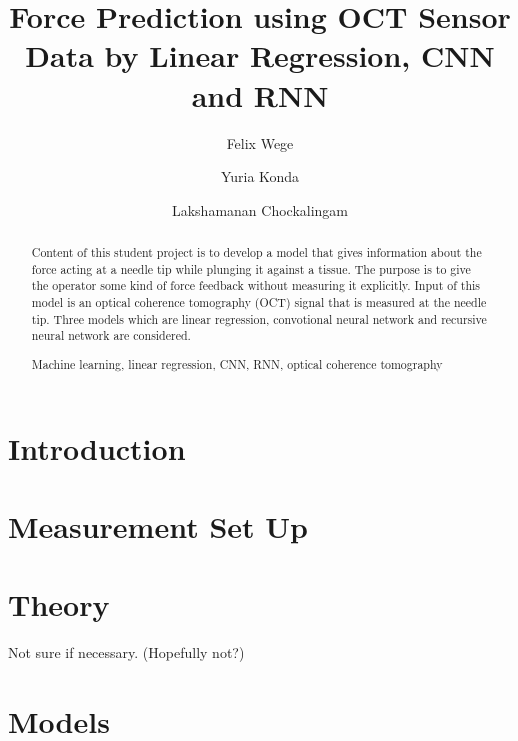 \documentclass[runningheads,a4paper]{llncs}
\newcommand{\keywords}[1]{\par\addvspace\baselineskip
\noindent\keywordname\enspace\ignorespaces#1}
\begin{document}
\mainmatter  %

\title{Force Prediction using OCT Sensor Data 
by Linear Regression, CNN and RNN}

\author{Felix Wege \and Yuria Konda \and Lakshamanan Chockalingam}



\maketitle


\begin{abstract}
Content of this student project is to develop a model that gives 
information about the force acting at a needle tip while plunging it against 
a tissue.
The purpose is to give the operator some kind of force feedback
without measuring it explicitly.
Input of this model is an optical coherence tomography (OCT) signal
that is measured at the needle tip.
Three models which are linear regression, convotional neural network
and recursive neural network are considered.

\keywords{Machine learning, linear regression, CNN, RNN, optical coherence tomography}
\end{abstract}


\section{Introduction}


\section{Measurement Set Up}


\section{Theory}

Not sure if necessary. (Hopefully not?)

\section{Models}
\end{document}
